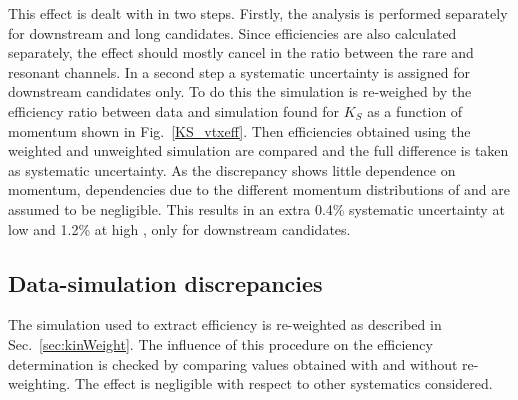 This effect is dealt with in two steps. Firstly, the analysis is performed separately for downstream and long candidates.
Since efficiencies are also calculated separately, the effect should mostly cancel in the ratio between the
rare and resonant channels. In a second step a systematic uncertainty is assigned for downstream candidates only.
To do this the simulation is re-weighed by the efficiency ratio between data and simulation
found for $K_S$ as a function of momentum shown in Fig.~\ref{KS_vtxeff}. Then efficiencies obtained using
the weighted and unweighted simulation are compared and the full difference is taken as systematic uncertainty. 
As the discrepancy shows little dependence on momentum, dependencies due to the different momentum 
distributions of \Lz and \KS are assumed to be negligible. This results in an extra 0.4\% systematic uncertainty
at low \qsq and 1.2\% at high \qsq, only for downstream candidates.

\subsection{Data-simulation discrepancies}

The simulation used to extract efficiency is re-weighted as described in Sec.~\ref{sec:kinWeight}.
The influence of this procedure on the efficiency determination is checked by comparing values obtained with
and without re-weighting. The effect is negligible with respect to other systematics considered.



